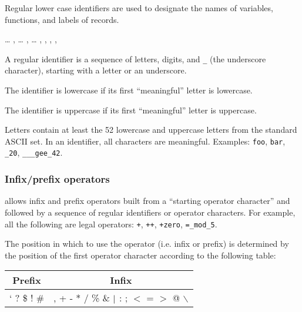 Regular lower case identifiers are used to designate the names of variables, functions,
and labels of records.

\begin{syn}
 \is {} \ldots {}
\sep
{} \is {} \ldots {}
\sep
{} \is {} \ldots {}
\sep
{} \is {} \orelse {}
\sep
{} \is \rep{ \tok{\_}} 
\sep
{} \is \rep{ \tok{\_}} 
\sep
{} \is {} \orelse {}
\end{syn}
\vspace{0.2cm}

A regular identifier is a sequence of letters, digits, and {\tt \_} (the
underscore character), starting with a letter or an underscore.

The identifier is lowercase if its first ``meaningful'' letter is lowercase.

The identifier is uppercase if its first ``meaningful'' letter is uppercase.

Letters contain at least the 52 lowercase and uppercase
letters from the standard ASCII set. In an identifier, all characters
are meaningful.
Examples: {\tt foo}, {\tt bar}, {\tt \_20},
{\tt \_\_\_gee\_42}.

\subsubsection{Infix/prefix operators}

{\focal} allows infix and prefix operators built from a
``starting operator character'' and followed by a sequence of
regular identifiers or operator characters. For example, all the
following are legal operators:
{\tt +}, {\tt ++}, {\tt \tilde+zero}, {\tt =\_mod\_5}.

The position in which to use the operator (i.e. infix or prefix)
is determined by the position of the first operator character
according to the following table:
\begin{center}
\begin{tabular}{|c|c|}
\hline
Prefix & Infix \\
\hline
` \tilde{} ? \$ ! \# &
, + - * / \% \& $\vertical$ : ; $<$ = $>$ @ \chapeau{} $\backslash$ \\
\hline
\end{tabular}
\end{center}

